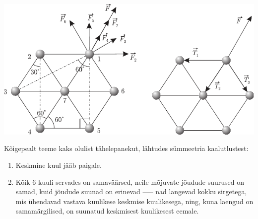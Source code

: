 \documentclass[10pt, twoside]{article}
\begin{document}
{%

\solu
\begin{center}
	\includegraphics[width=\linewidth]{2005-lahg-04-lah}
\end{center}

Kõigepealt teeme kaks olulist tähelepanekut, lähtudes sümmeetria kaalutlustest:
\begin{enumerate}[wide=0pt, label={\arabic*)}]
	\item Keskmine kuul jääb paigale.
	\item Kõik 6 kuuli servades on samaväärsed, neile mõjuvate jõudude suurused on samad, kuid jõudude suunad on erinevad –--- nad langevad kokku sirgetega, mis ühendavad vastava kuulikese keskmise kuulikesega, ning, kuna laengud on samamärgilised, on suunatud keskmisest kuulikesest eemale.
\end{enumerate}

}
\end{document}
